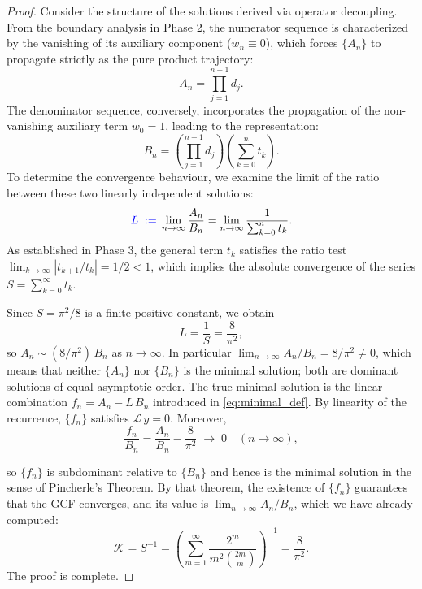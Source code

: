 \documentclass[10pt,a4paper]{amsart}
\begin{document}
	\begin{proof}
		Consider the structure of the solutions derived via operator decoupling. From the boundary analysis in Phase 2, the numerator sequence is characterized by the vanishing of its auxiliary component ($w_n \equiv 0$), which forces $\{A_n\}$ to propagate strictly as the pure product trajectory:
		\begin{equation}
			A_n = \prod_{j=1}^{n+1} d_j.
		\end{equation}
		The denominator sequence, conversely, incorporates the propagation of the non-vanishing auxiliary term $w_0 = 1$, leading to the representation:
		\begin{equation}
			B_n = \left( \prod_{j=1}^{n+1} d_j \right) \left( \sum_{k=0}^{n} t_k \right).
		\end{equation}
		To determine the convergence behaviour, we examine the limit of the ratio between these two linearly independent solutions:
		\begin{equation}
			\textcolor{blue}{L \;:=\;} \lim_{n \to \infty} \frac{A_n}{B_n} = \lim_{n \to \infty} \frac{1}{\sum_{k=0}^{n} t_k}.
		\end{equation}
		As established in Phase 3, the general term $t_k$ satisfies the ratio test $\lim_{k \to \infty} |t_{k+1}/t_k| = 1/2 < 1$, which implies the absolute convergence of the series $S = \sum_{k=0}^{\infty} t_k$.
		
		Since $S = \pi^2/8$ is a finite positive constant, we obtain
		\begin{equation}
			L = \frac{1}{S} = \frac{8}{\pi^2},
		\end{equation}
		so $A_n \sim (8/\pi^2)\,B_n$ as $n\to\infty$.  In particular $\lim_{n\to\infty} A_n/B_n = 8/\pi^2 \neq 0$, which means that neither $\{A_n\}$ nor $\{B_n\}$ is the minimal solution; both are dominant solutions of equal asymptotic order.
		The true minimal solution is the linear combination $f_n = A_n - L\,B_n$ introduced in \eqref{eq:minimal_def}.  By linearity of the recurrence, $\{f_n\}$ satisfies $\mathcal{L}\,y=0$.  Moreover,
		\begin{equation}
			\frac{f_n}{B_n} = \frac{A_n}{B_n} - \frac{8}{\pi^2} \;\longrightarrow\; 0 \quad (n \to \infty),
		\end{equation}
		
		so $\{f_n\}$ is subdominant relative to $\{B_n\}$ and hence is the minimal solution in the sense of Pincherle's Theorem.  By that theorem, the existence of $\{f_n\}$ guarantees that the GCF converges, and its value is $\lim_{n\to\infty} A_n/B_n$, which we have already computed:
		\begin{equation}
			\mathcal{K} = S^{-1} = \left( \sum_{m=1}^{\infty} \frac{2^m}{m^2 \binom{2m}{m}} \right)^{-1} = \frac{8}{\pi^2}.
		\end{equation}
		The proof is complete.
	\end{proof}
\end{document}
